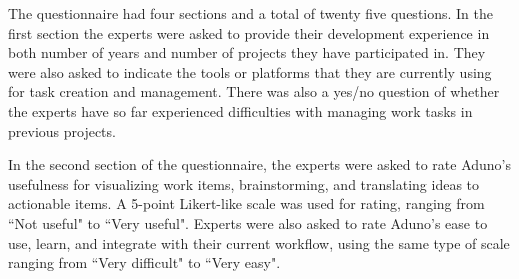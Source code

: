 \documentclass[conference]{IEEEtran}
\newcommand{\cmark}{\ding{51}}%
\begin{document}
%

The questionnaire had four sections and a total of twenty five questions. In the first section the experts were asked to provide their development experience in both number of years and number of projects they have participated in. They were also asked to indicate the tools or platforms that they are currently using for task creation and management. There was also a yes/no question of whether the experts have so far experienced difficulties with managing work tasks in previous projects. 

In the second section of the questionnaire, the experts were asked to rate Aduno's usefulness for visualizing work items, brainstorming, and translating ideas to actionable items. A 5-point Likert-like scale was used for rating, ranging from ``Not useful" to ``Very useful". Experts were also asked to rate Aduno's ease to use, learn, and integrate with their current workflow, using the same type of scale ranging from ``Very difficult" to ``Very easy".
\end{document}
